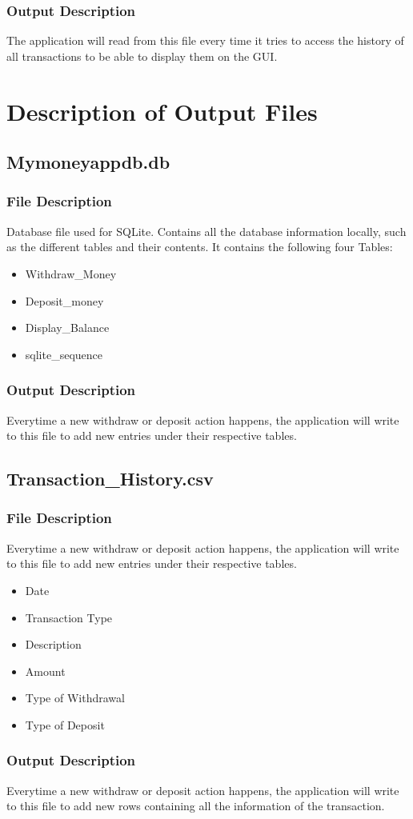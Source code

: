 \documentclass[12pt]{article}
\begin{document}
\subsubsection{Output Description}
The application will read from this file every time it tries to access the history of all transactions to be able to display them on the GUI.

\section{Description of Output Files}

\subsection{Mymoneyappdb.db}

\subsubsection{File Description}
Database file used for SQLite. Contains all the database information locally, such as the different tables and their contents. It contains the following four Tables:
\begin{itemize}
  \item Withdraw\_Money
  \item Deposit\_money
  \item Display\_Balance
  \item sqlite\_sequence
\end{itemize}

\subsubsection{Output Description}
Everytime a new withdraw or deposit action happens, the application will write to this file to add new entries under their respective tables.  

\subsection{Transaction\_History.csv}

\subsubsection{File Description}
Everytime a new withdraw or deposit action happens, the application will write to this file to add new entries under their respective tables.  
\begin{itemize}
  \item Date
  \item Transaction Type
  \item Description
  \item Amount
  \item Type of Withdrawal
  \item Type of Deposit
\end{itemize}

\subsubsection{Output Description}
Everytime a new withdraw or deposit action happens, the application will write to this file to add new rows containing all the information of the transaction.
\end{document}
